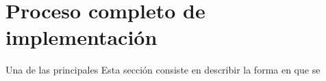 
\section{Proceso completo de implementación}
\label{analisis:visionyuso}

 Una de las principales 
 Esta sección consiste en describir la forma en que se 

